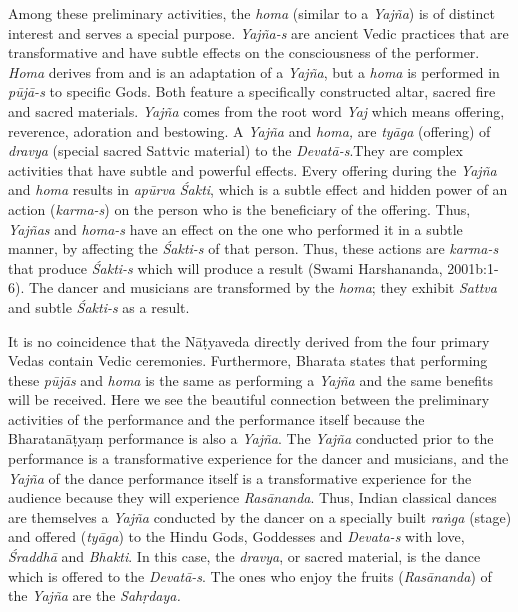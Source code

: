 Among these preliminary activities, the \textit{homa} (similar to a \textit{Yajña}) is of distinct interest and serves a special purpose. \textit{Yajña-s} are ancient Vedic practices that are transformative and have subtle effects on the consciousness of the performer. \textit{Homa} derives from and is an adaptation of a \textit{Yajña}, but a \textit{homa} is performed in \textit{pūjā-s }to specific Gods. Both feature a specifically constructed altar, sacred fire and sacred materials. \textit{Yajña} comes from the root word \textit{Yaj} which means offering, reverence, adoration and bestowing. A \textit{Yajña} and \textit{homa,} are \textit{tyāga }(offering) of \textit{dravya} (special sacred Sattvic material) to the \textit{Devatā-s}.\break They are complex activities that have subtle and powerful effects. Every offering during the \textit{Yajña} and \textit{homa} results in \textit{apūrva} \textit{Śakti}, which is a subtle effect and hidden power of an action (\textit{karma-s}) on the person who is the beneficiary of the offering. Thus, \textit{Yajñas} and \textit{homa-s} have an effect on the one who performed it in a subtle manner, by affecting the \textit{Śakti-s }of that person. Thus, these actions are \textit{karma-s} that produce \textit{Śakti-s} which will produce a result (Swami Harshananda, 2001b:1-6). The dancer and musicians are transformed by the \textit{homa}; they exhibit \textit{Sattva} and subtle \textit{Śakti-s} as a result.

It is no coincidence that the Nāṭyaveda directly derived from the four primary Vedas contain Vedic ceremonies. Furthermore, Bharata states that performing these \textit{pūjās} and \textit{homa} is the same as performing a \textit{Yajña} and the same benefits will be received. Here we see the beautiful connection between the preliminary activities of the performance and the performance itself because the Bharatanāṭyaṃ performance is also a \textit{Yajña}. The \textit{Yajña} conducted prior to the performance is a transformative experience for the dancer and musicians, and the \textit{Yajña} of the dance performance itself is a transformative experience for the audience because they will experience \textit{Rasānanda}. Thus, Indian classical dances are themselves a \textit{Yajña} conducted by the dancer on a specially built \textit{raṅga} (stage) and offered (\textit{tyāga}) to the Hindu Gods, Goddesses and \textit{Devata-s} with love, \textit{Śraddhā }and \textit{Bhakti}. In this case, the \textit{dravya}, or sacred material, is the dance which is offered to the \textit{Devatā-s}. The ones who enjoy the fruits (\textit{Rasānanda}) of the \textit{Yajña} are the \textit{Sahṛdaya.}


